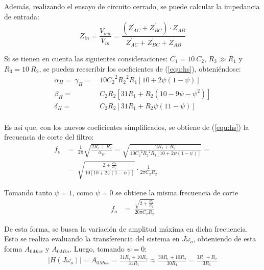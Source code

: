 Además, realizando el ensayo de circuito cerrado, se puede calcular la impedancia de entrada:
\begin{equation}
	Z_{in} = \frac{V_{out}}{V_{in}} = \frac{\left( Z_{AC}^{'} + Z_{BC}^{'} \right) \cdot Z_{AB}}{Z_{AC}^{'} + Z_{BC}^{'} + Z_{AB}}
	\label{equ:zin}
\end{equation}

Si se tienen en cuenta las siguientes consideraciones: $C_1 = 10 \ C_2$, $R_3 \gg R_1$ y $R_3 = 10 \ R_2$, se pueden reescribir los coeficientes de (\ref{equ:hs}), obteniéndose: 
\begin{equation}
\begin{split}
	\alpha_H =\ \gamma_H =\ & 10 {C_{2}}^{2} {R_{2}}^{2} R_{1} \left[ 10 + 2 \psi \left(1 - \psi \right) \right] \\
	\beta_H =\ & C_{2} R_{2} \left[ 31 R_1 + R_2 \left(10 - 9 \psi - \psi^2 \right) \right] \\
	\delta_H =\ & C_{2} R_{2} \left[ 31 R_1 + R_2 \psi \left(11 - \psi \right) \right] \\
\end{split}
\label{equ:simplifica}
\end{equation}

Es así que, con los nuevos coeficientes simplificados, se obtiene de (\ref{equ:hs}) la frecuencia de corte del filtro:
\begin{equation}
\begin{split}
	f_o &=\ \frac{1}{2 \pi} \sqrt{\frac{2R_1 + R_2}{\alpha_H}} = \sqrt{\frac{2R_1 + R_2}{10 {C_{2}}^{2} {R_{2}}^{2} R_{1} \left[ 10 + 2 \psi \left(1 - \psi \right) \right]}} = \\
	&=\ \sqrt{\frac{2 + \frac{R_2}{R_1}}{10 \left[ 10 + 2 \psi \left(1 - \psi \right) \right]}} \cdot \frac{1}{2 \pi C_2 R_2}
\end{split}
\label{equ:fosimp}
\end{equation}

Tomando tanto $\psi = 1$, como $\psi = 0$ se obtiene la misma frecuencia de corte
\begin{equation*}
\begin{split}
	f_o &=\ \frac{\sqrt{2 + \frac{R_2}{R_1}}}{20 \pi C_2 R_2}
\end{split}
\end{equation*}

De esta forma, se busca la variación de amplitud máxima en dicha frecuencia. Esto se realiza evaluando la transferencia del sistema en $J\omega_o$, obteniendo de esta forma $A_{0Max}$ y $A_{0Min}$. Luego, tomando $\psi = 0$:
\begin{equation*}
\begin{split}
|H\left(J\omega_o\right)| = A_{0Max} = \frac{31 R_{1} + 10 R_{2}}{31 R_{1}} \approx \frac{30 R_{1} + 10 R_{2}}{30 R_{1}} = \frac{3 R_{1} + R_{2}}{3 R_{1}}
\end{split}
\end{equation*}

